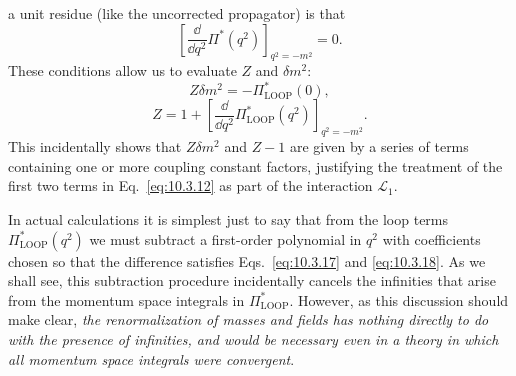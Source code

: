 a unit residue (like the uncorrected propagator) is that
\begin{equation}
\left[\frac{\dd}{\dd q^2}\Pi^*(q^2)\right]_{q^2=-m^2}=0.
\tag{10.3.18}\label{eq:10.3.18}
\end{equation}
These conditions allow us to evaluate $Z$ and $\delta m^2$:
\begin{equation}
Z\delta m^2=-\Pi^*_{\mathrm{LOOP}}(0),
\tag{10.3.19}\label{eq:10.3.19}
\end{equation}
\begin{equation}
Z=1+\left[\frac{\dd}{\dd q^2}\Pi^*_{\mathrm{LOOP}}(q^2)\right]_{q^2=-m^2}.
\tag{10.3.20}\label{eq:10.3.20}
\end{equation}
This incidentally shows that $Z\delta m^2$ and $Z-1$ are given by a series of
terms containing one or more coupling constant factors, justifying the
treatment of the first two terms in Eq.~\eqref{eq:10.3.12} as part of the
interaction $\mathcal L_1$.

In actual calculations it is simplest just to say that from the loop terms
$\Pi^*_{\mathrm{LOOP}}(q^2)$ we must subtract a first-order polynomial in
$q^2$ with coefficients chosen so that the difference satisfies
Eqs.~\eqref{eq:10.3.17} and \eqref{eq:10.3.18}. As we shall see, this
subtraction procedure incidentally cancels the infinities that arise from the
momentum space integrals in $\Pi^*_{\mathrm{LOOP}}$. However, as this
discussion should make clear, \emph{the renormalization of masses and fields
has nothing directly to do with the presence of infinities, and would be
necessary even in a theory in which all momentum space integrals were
convergent}.

